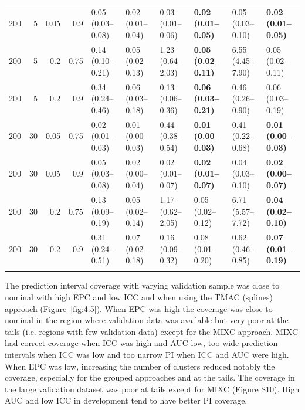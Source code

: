 \begin{table}
\begin{tabular}{rrrr llllll}
200 & 5 & 0.05 & 0.9 & 0.05 (0.03--0.08) & 0.02 (0.01--0.04) & 0.03 (0.01--0.06) & \textbf{0.02 (0.01--0.05)} & 0.05 (0.03--0.10) & \textbf{0.02 (0.01--0.05)} \\
200 & 5 & 0.2 & 0.75 & 0.14 (0.10--0.21) & 0.05 (0.02--0.13) & 1.23 (0.64--2.03) & \textbf{0.05 (0.02--0.11)} & 6.55 (4.45--7.90) & 0.05 (0.02--0.11) \\
200 & 5 & 0.2 & 0.9 & 0.34 (0.24--0.46) & 0.06 (0.03--0.18) & 0.13 (0.06--0.36) & \textbf{0.06 (0.03--0.21)} & 0.46 (0.26--0.90) & 0.06 (0.03--0.19) \\
200 & 30 & 0.05 & 0.75 & 0.02 (0.01--0.03) & 0.01 (0.00--0.03) & 0.44 (0.38--0.54) & \textbf{0.01 (0.00--0.03)} & 0.41 (0.22--0.68) & \textbf{0.01 (0.00--0.03)} \\
200 & 30 & 0.05 & 0.9 & 0.05 (0.03--0.08) & 0.02 (0.00--0.04) & 0.02 (0.01--0.07) & \textbf{0.02 (0.01--0.07)} & 0.04 (0.03--0.10) & \textbf{0.02 (0.00--0.07)} \\
200 & 30 & 0.2 & 0.75 & 0.13 (0.09--0.19) & 0.05 (0.02--0.14) & 1.17 (0.62--2.05) & 0.05 (0.02--0.12) & 6.71 (5.57--7.72) & \textbf{0.04 (0.02--0.10)} \\
200 & 30 & 0.2 & 0.9 & 0.31 (0.24--0.51) & 0.07 (0.02--0.18) & 0.16 (0.09--0.32) & 0.08 (0.01--0.20) & 0.62 (0.46--0.85) & \textbf{0.07 (0.01--0.19)} \\
\bottomrule
\addlinespace[0.5em]
\multicolumn{10}{l}{\textsuperscript{a}Deciles are calculated only with 10 points instead of 100.}
\end{tabular}
\end{table}

The prediction interval coverage with varying validation sample was close to nominal with high \gls{EPC} and low \gls{ICC} and when using the \gls{TMAC} (splines) approach (Figure~\ref{fig:4:5}). When \gls{EPC} was high the coverage was close to nominal in the region where validation data was available but very poor at the tails (i.e. regions with few validation data) except for the \gls{MIXC} approach. \gls{MIXC} had correct coverage when \gls{ICC} was high and \gls{AUC} low, too wide prediction intervals when \gls{ICC} was low and too narrow \gls{PI} when \gls{ICC} and \gls{AUC} were high. When \gls{EPC} was low, increasing the number of clusters reduced notably the coverage, especially for the grouped approaches and at the tails. The coverage in the large validation dataset was poor at tails except for \gls{MIXC} (Figure S10). High \gls{AUC} and low \gls{ICC} in development tend to have better \gls{PI} coverage.

